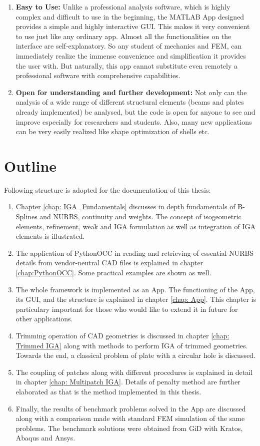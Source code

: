 \documentclass[12pt, a4paper]{report}
\begin{document}
\begin{enumerate}
    \item \textbf{Easy to Use:}\newline
    Unlike a professional analysis software, which is highly complex and difficult to use in the beginning, the MATLAB App designed provides a simple and highly interactive GUI. This makes it very convenient to use just like any ordinary app. Almost all the functionalities on the interface are self-explanatory. So any student of mechanics and FEM, can immediately realize the immense convenience and simplification it provides the user with. But naturally, this app cannot substitute even remotely a professional software with comprehensive capabilities. 
    \item \textbf{Open for understanding and further development:}\newline
    Not only can the analysis of a wide range of different structural elements (beams and plates already implemented) be analysed, but the code is open for anyone to see and improve especially for researchers and students. Also, many new applications can be very easily realized like shape optimization of shells etc.
    
\end{enumerate}

\section{Outline}
Following structure is adopted for the documentation of this thesis:
\begin{enumerate}
    \item Chapter \ref{chap: IGA_Fundamentals} discusses in depth fundamentals of B-Splines and NURBS, continuity and weights. The concept of isogeometric elements, refinement, weak and IGA formulation as well as integration of IGA elements is illustrated.
    \item The application of PythonOCC in reading and retrieving of essential NURBS details from vendor-neutral CAD files is explained in chapter \ref{chap:PythonOCC}. Some practical examples are shown as well.
    \item The whole framework is implemented as an App. The functioning of the App, its GUI, and the structure is explained in chapter \ref{chap: App}. This chapter is particulary important for those who would like to extend it in future for other applications.
    \item Trimming operation of CAD geometries is discussed in chapter \ref{chap: Trimmed IGA} along with methods to perform IGA of trimmed geometries. Towards the end, a classical problem of plate with a circular hole is discussed.
    \item The coupling of patches along with different procedures is explained in detail in chapter \ref{chap: Multipatch IGA}. Details of penalty method are further elaborated as that is the method implemented in this thesis.
    \item Finally, the results of benchmark problems solved in the App are discussed along with a comparison made with standard FEM simulation of the same problems. The benchmark solutions were obtained from GiD with Kratos, Abaqus and Ansys.
\end{enumerate}
\end{document}
